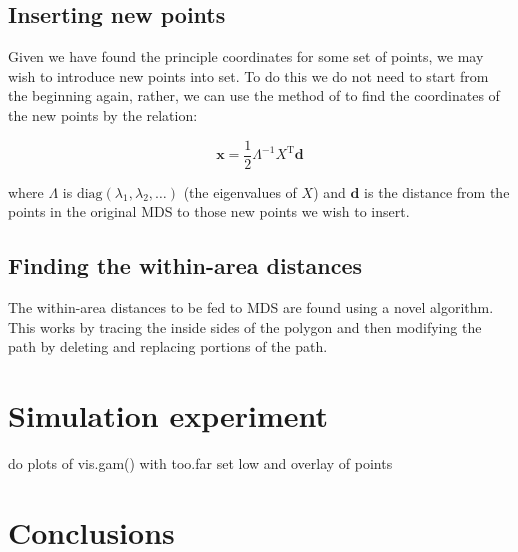 \documentclass[a4paper,10pt]{amsart}
\newcommand{\tr}[1]{#1^{\text{T}}}
\newcommand{\diag}{\text{diag}}
\begin{document}
\subsection{Inserting new points}

Given we have found the principle coordinates for some set of points, we may wish to introduce new points into set. To do this we do not need to start from the beginning again, rather, we can use the method of \cite{gower1968} to find the coordinates of the new points by the relation:

\begin{equation*}
\mathbf{x} = \frac{1}{2} \Lambda^{-1} \tr{X} \mathbf{d}
\end{equation*}

where $\Lambda$ is $\diag(\lambda_1, \lambda_2, \dots)$ (the eigenvalues of $X$) and $\mathbf{d}$ is the distance from the points in the original MDS to those new points we wish to insert.



\subsection{Finding the within-area distances}

The within-area distances to be fed to MDS are found using a novel algorithm. This works by tracing the inside sides of the polygon and then modifying the path by deleting and replacing portions of the path.




\section{Simulation experiment}


do plots of vis.gam() with too.far set low and overlay of points


\section{Conclusions}




\end{document}

